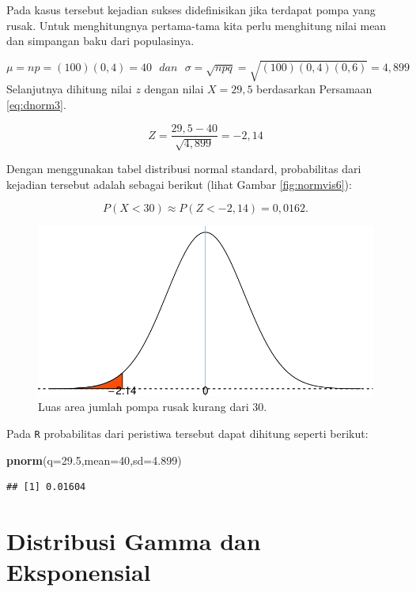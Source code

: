 \documentclass[]{book}
\newenvironment{Shaded}{\begin{snugshade}}{\end{snugshade}}
\newcommand{\KeywordTok}[1]{\textcolor[rgb]{0.13,0.29,0.53}{\textbf{#1}}}
\newcommand{\DataTypeTok}[1]{\textcolor[rgb]{0.13,0.29,0.53}{#1}}
\newcommand{\DecValTok}[1]{\textcolor[rgb]{0.00,0.00,0.81}{#1}}
\newcommand{\FloatTok}[1]{\textcolor[rgb]{0.00,0.00,0.81}{#1}}
\newcommand{\NormalTok}[1]{#1}
\begin{document}
Pada kasus tersebut kejadian sukses didefinisikan jika terdapat pompa
yang rusak. Untuk menghitungnya pertama-tama kita perlu menghitung nilai
mean dan simpangan baku dari populasinya.

\[
\mu=np=\left(100\right)\left(0,4\right)=40\ \ \ dan\ \ \ \sigma=\sqrt{npq}=\sqrt{\left(100\right)\left(0,4\right)\left(0,6\right)}=4,899
\] Selanjutnya dihitung nilai \(z\) dengan nilai \(X=29,5\) berdasarkan
Persamaan \eqref{eq:dnorm3}.

\[
Z=\frac{29,5-40}{\sqrt{4,899}}=-2,14
\]

Dengan menggunakan tabel distribusi normal standard, probabilitas dari
kejadian tersebut adalah sebagai berikut (lihat Gambar
\ref{fig:normvis6}):

\[
P\left(X<30\right)\approx P\left(Z<-2,14\right)=0,0162.
\]

\begin{figure}

{\centering \includegraphics[width=0.7\linewidth]{EnvStat_files/figure-latex/normvis8-1} 

}

\caption{Luas area jumlah pompa rusak kurang dari 30.}\label{fig:normvis8}
\end{figure}

Pada \texttt{R} probabilitas dari peristiwa tersebut dapat dihitung
seperti berikut:

\begin{Shaded}
\begin{Highlighting}[]
\KeywordTok{pnorm}\NormalTok{(}\DataTypeTok{q=}\FloatTok{29.5}\NormalTok{,}\DataTypeTok{mean=}\DecValTok{40}\NormalTok{,}\DataTypeTok{sd=}\FloatTok{4.899}\NormalTok{)}
\end{Highlighting}
\end{Shaded}

\begin{verbatim}
## [1] 0.01604
\end{verbatim}

\section{Distribusi Gamma dan
Eksponensial}\label{distribusi-gamma-dan-eksponensial}
\end{document}
